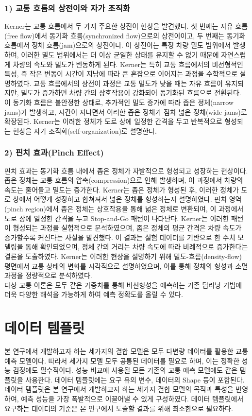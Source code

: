 \documentclass[11pt]{report}
\begin{document}
\subsubsection*{1) 교통 흐름의 상전이와 자가 조직화}
Kerner는 교통 흐름에서 두 가지 주요한 상전이 현상을 발견했다. 
첫 번째는 자유 흐름(free flow)에서 동기화 흐름(synchronized flow)으로의 상전이이고, 두 번째는 동기화 흐름에서 정체 흐름(jam)으로의 상전이다. 
이 상전이는 특정 차량 밀도 범위에서 발생하며, 이러한 밀도 범위에서는 더 이상 균일한 상태를 유지할 수 없기 때문에 자연스럽게 차량의 속도와 밀도가 변동하게 된다. 
Kerner는 특히 교통 흐름에서의 비선형적인 특성, 즉 작은 변동이 시간이 지남에 따라 큰 혼잡으로 이어지는 과정을 수학적으로 설명하였다.
교통 흐름에서의 상전이 과정은 교통 밀도가 낮을 때는 자유 흐름이 유지되지만, 밀도가 증가하면 차량 간의 상호작용이 강화되어 동기화된 흐름으로 전환된다. 
이 동기화 흐름은 불안정한 상태로, 추가적인 밀도 증가에 따라 좁은 정체(narrow jams)가 발생하고, 시간이 지나면서 이러한 좁은 정체가 점차 넓은 정체(wide jams)로 확장된다. 
Kerner는 이러한 정체가 도로 상에 일정한 간격을 두고 반복적으로 형성되는 현상을 자가 조직화(self-organization)로 설명한다.

\subsubsection*{2) 핀치 효과(Pinch Effect)}
핀치 효과는 동기화 흐름 내에서 좁은 정체가 자발적으로 형성되고 성장하는 현상이다. 
좁은 정체는 교통 흐름의 압축(compression)으로 인해 발생하며, 이 과정에서 차량의 속도는 줄어들고 밀도는 증가한다. 
Kerner는 좁은 정체가 형성된 후, 이러한 정체가 도로 상에서 어떻게 성장하고 합쳐져서 넓은 정체를 형성하는지 설명하였다. 
핀치 영역(pinch region)에서 좁은 정체는 상호작용을 통해 넓은 정체로 변환되며, 이 과정에서 도로 상에 일정한 간격을 두고 Stop-and-Go 패턴이 나타난다.
Kerner는 이러한 패턴이 형성되는 과정을 실험적으로 분석하였으며, 좁은 정체의 평균 간격은 차량 속도가 증가할수록 커진다는 사실을 발견했다. 
이 결과는 실험 데이터를 기반으로 한 수치 모델링을 통해 확인되었으며, 정체 간의 거리는 차량 속도에 따라 비례적으로 증가한다는 결론을 도출하였다. 
Kerner는 이러한 현상을 설명하기 위해 밀도-흐름(density-flow) 평면에서 교통 상태의 변화를 시각적으로 설명하였으며, 이를 통해 정체의 형성과 소멸 과정을 정량적으로 분석하였다. \\

\indent 다상 교통 이론은 모두 같은 가중치를 통해 비선형성을 예측하는 기존 딥러닝 기법에 더욱 다양한 해석을 가능하게 하여 예측 정확도를 올릴 수 있다. 

\section{데이터 템플릿}
본 연구에서 개발하고자 하는 세가지의 결합 모델은 모두 다변량 데이터를 활용한 교통 예측 모델이다. 
따라서 세가지 모델 모두 공통된 데이터를 필요로 하며, 이는 정확한 성능 검정에도 필수적이다. 
성능 비교에 사용될 모든 기존의 교통 예측 모델에도 같은 템플릿을 사용한다. 
데이터 템플릿에는 요구 유의 변수, 데이터의 Shape 등이 포함된다. 
데이터 템플릿은 본 연구에서 개발하고자 하는 세가지 결합 모델의 목적과 특성을 반영하여, 예측 성능을 가장 폭발적으로 이끌어낼 수 있게 구성하였다. 
데이터 템플릿에서 요구하는 데이터의 기준은 본 연구에서 도출할 결과를 위해 최소한으로 필요하다. 
\end{document}
